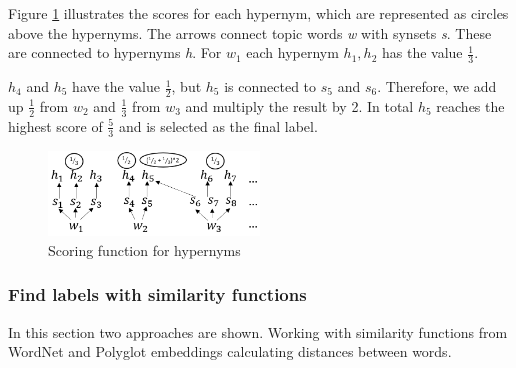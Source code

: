 Figure \ref{pic:HypFun} illustrates the scores for each hypernym, which are represented as circles above the hypernyms. The arrows connect topic words \textit{w} with synsets \textit{s}. These are connected to hypernyms \textit{h}. For $w_{1}$ each hypernym $h_{1},h_{2}$ has the value $\tfrac{1}{3}$. {$h_{4}$ and $h_{5}$ have the value $\tfrac{1}{2}$, 
	but $h_{5}$ is connected to $s_{5}$ and $s_{6}$. Therefore, we add up $\tfrac{1}{2}$ from $w_{2}$ and $\tfrac{1}{3}$ from $w_{3}$ and multiply the result by 2. In total $h_{5}$ reaches the highest score of $\tfrac{5}{3}$ and is selected as the final label.

\begin{figure}
	\centering
	\includegraphics[width=0.5\textwidth]{gfx/Wordnet/HypFunF.png}
	\caption[\ac{ATL}: Scoring function for hypernyms]{Scoring function for hypernyms}
	\label{pic:HypFun}	
\end{figure}

\subsubsection{Find labels with similarity functions}
In this section two approaches are shown. Working with similarity functions from WordNet and Polyglot embeddings calculating distances between words. 

}
